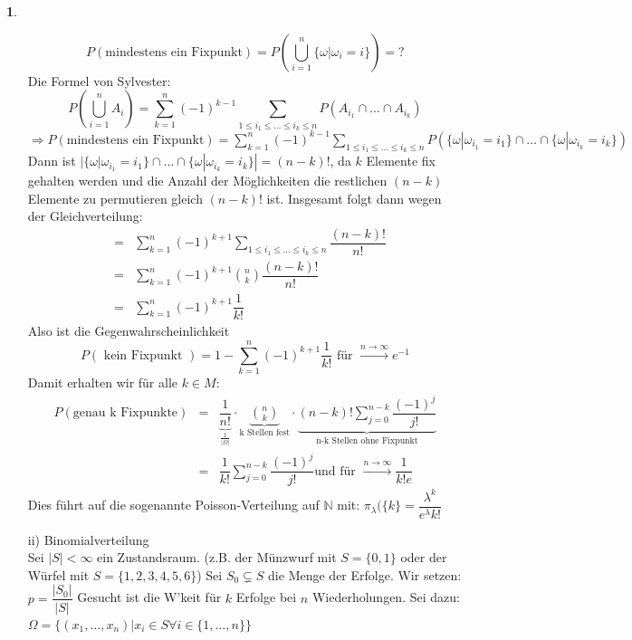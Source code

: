 \documentclass[10pt,a4paper]{report}
\numberwithin{equation}{section}
\numberwithin{figure}{section}
\theoremstyle{plain}
\theoremstyle{definition}
\newtheorem{example}[thm]{\protect\examplename}
\theoremstyle{remark}
\theoremstyle{plain}
\providecommand{\examplename}{Beispiel}
\newcommand{\1}{ \mathbb{1} } %
\begin{document}
\begin{example}
\begin{itemize}
\[P(\text{mindestens ein Fixpunkt})=P\left(\bigcup\limits_{i=1}^n \{\omega|\omega_i=i\}\right)=?\]
    Die Formel von Sylvester:
    \[P\left(\bigcup\limits_{i=1}^nA_i\right)=\sum\limits_{k=1}^n(-1)^{k-1}\sum\limits_{1\leq i_1 \leq \dots \leq i_k \leq n}P(A_{i_1}\cap\dots\cap A_{i_k})\]
    $\Rightarrow P(\text{mindestens ein Fixpunkt})
    =\sum\limits_{k=1}^n(-1)^{k-1}\sum\limits_{1\leq i_1 \leq \dots \leq i_k \leq n}P(\{\omega|\omega_{i_1}=i_1\}\cap\dots\cap \{\omega|\omega_{i_k}=i_k\})$
    Dann ist $|\{\omega|\omega_{i_1}=i_1\}\cap\dots\cap
    \{\omega|\omega_{i_k}=i_k\}|=(n-k)!$, da $k$ Elemente fix gehalten
    werden und die Anzahl der Möglichkeiten die restlichen $(n-k)$
    Elemente zu permutieren gleich $(n-k)!$ ist. Insgesamt folgt dann
    wegen der Gleichverteilung:
    \begin{eqnarray*}
      &=&\sum\limits_{k=1}^n(-1)^{k+1}\sum\limits_{1\leq i_1 \leq \dots \leq i_k \leq n}\dfrac{(n-k)!}{n!}\\
      &=&\sum\limits_{k=1}^n(-1)^{k+1}\binom{n}{k}\dfrac{(n-k)!}{n!}\\
      &=&\sum\limits_{k=1}^n(-1)^{k+1}\dfrac{1}{k!}
    \end{eqnarray*}
    Also ist die Gegenwahrscheinlichkeit
 \[P(\text{ kein Fixpunkt })=1-\sum\limits_{k=1}^n(-1)^{k+1}\dfrac{1}{k!}\text{ für } \overset{n \to \infty}{\rightarrow} e^{-1}\]
    Damit erhalten wir für alle $k \in M$:
    \begin{eqnarray*}
      P(\text{genau k
        Fixpunkte})&=&\underbrace{\dfrac{1}{n!}}_\frac{1}{|\Omega|}\cdot
      \underbrace{\binom{n}{k}}_{\text{k Stellen fest}}\cdot
      \underbrace{(n-k)!\sum\limits_{j=0}^{n-k}\dfrac{(-1)^j}{j!}}_{\text{n-k
          Stellen ohne Fixpunkt}} \\
      &=&\dfrac{1}{k!}\sum\limits_{j=0}^{n-k}\dfrac{(-1)^j}{j!}\text{
        und für }\overset{n \to \infty}{\rightarrow} \dfrac{1}{k!e}
    \end{eqnarray*}
    Dies führt auf die sogenannte Poisson-Verteilung auf $\mathbb{N}$ mit: $\pi_\lambda(\{k\}=\dfrac{\lambda^k}{e^\lambda k!}$
    \item[ii)] Binomialverteilung\\
    Sei $|S|<\infty$ ein Zustandsraum. (z.B. der Münzwurf mit $S=\{0,1\}$ oder der Würfel mit $S=\{1,2,3,4,5,6\}$)
    Sei $S_0 \subsetneq S$ die Menge der Erfolge. Wir setzen:
    $p=\dfrac{|S_0|}{|S|}$
    Gesucht ist die W'keit für $k$ Erfolge bei $n$ Wiederholungen. Sei  dazu:
    $\Omega=\{(x_1,\dots,x_n)|x_i \in S \forall i \in \{1,\dots,n\}\}$

\end{itemize}
\end{example}
\end{document}

